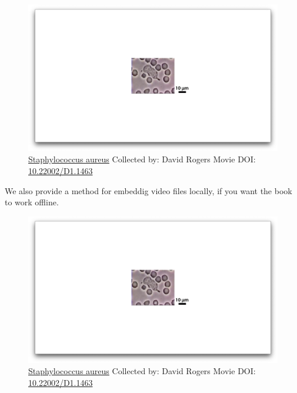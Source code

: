 \documentclass[]{tufte-book}
\begin{document}
\begin{figure}
\includegraphics{movie_stills/1_1} \caption[\protect\hyperlink{methods}{Staphylococcus aureus} Collected
by: David Rogers Movie DOI:
\href{https://doi.org/10.22002/D1.1463}{10.22002/D1.1463}]{\protect\hyperlink{methods}{Staphylococcus aureus} Collected
by: David Rogers Movie DOI:
\href{https://doi.org/10.22002/D1.1463}{10.22002/D1.1463}}\label{fig:1-1}
\end{figure}

We also provide a method for embeddig video files locally, if you want
the book to work offline.

\begin{figure}
\includegraphics{movie_stills/1_1} \caption[\protect\hyperlink{methods}{Staphylococcus aureus} Collected
by: David Rogers Movie DOI:
\href{https://doi.org/10.22002/D1.1463}{10.22002/D1.1463}]{\protect\hyperlink{methods}{Staphylococcus aureus} Collected
by: David Rogers Movie DOI:
\href{https://doi.org/10.22002/D1.1463}{10.22002/D1.1463}}\label{fig:1-1-embed}
\end{figure}
\end{document}
